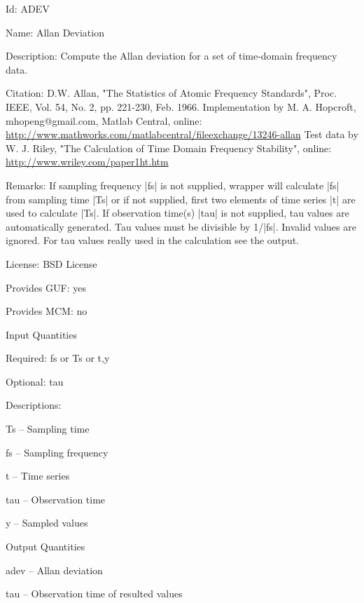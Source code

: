 \begin{tightdesc}
\item [Id:] ADEV
\item [Name:] Allan Deviation
\item [Description:] Compute the Allan deviation for a set of time-domain frequency data.
\item [Citation:] D.W. Allan, "The Statistics of Atomic Frequency Standards", Proc. IEEE, Vol. 54, No. 2, pp. 221-230, Feb. 1966. Implementation by M. A. Hopcroft, mhopeng@gmail.com, Matlab Central, online: \url{http://www.mathworks.com/matlabcentral/fileexchange/13246-allan} Test data by W. J. Riley, "The Calculation of Time Domain Frequency Stability", online: \url{http://www.wriley.com/paper1ht.htm}
\item [Remarks:] If sampling frequency |fs| is not supplied, wrapper will calculate |fs| from sampling time |Ts| or if not supplied, first two elements of time series |t| are used to calculate |Ts|. If observation time(s) |tau| is not supplied, tau values are automatically generated. Tau values must be divisible by 1/|fs|. Invalid values are ignored. For tau values really used in the calculation see the output.
\item [License:] BSD License
\item [Provides GUF:] yes
\item [Provides MCM:] no
\item [Input Quantities] \rule{0em}{0em}
    \begin{tightdesc}
    \item [Required:] 
        \textsf{fs} or \textsf{Ts} or \textsf{t},\enspace \textsf{y}
    \item [Optional:] 
        \textsf{tau}
    \end{tightdesc}
\item [Descriptions:] \rule{0em}{0em}
    \begin{tightdesc}
        \item[\textsf{Ts}] -- Sampling time
        \item[\textsf{fs}] -- Sampling frequency
        \item[\textsf{t}] -- Time series
        \item[\textsf{tau}] -- Observation time
        \item[\textsf{y}] -- Sampled values
    \end{tightdesc}
\item [Output Quantities] \rule{0em}{0em}
    \begin{tightdesc}
        \item[\textsf{adev}] -- Allan deviation
        \item[\textsf{tau}] -- Observation time of resulted values
    \end{tightdesc}
\end{tightdesc}
